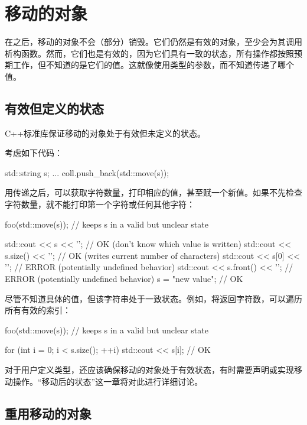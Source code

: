\section{移动的对象}
在之后，移动的对象不会（部分）销毁。它们仍然是有效的对象，至少会为其调用析构函数。然而，它们也是有效的，因为它们具有一致的状态，所有操作都按照预期工作，但不知道的是它们的值。这就像使用类型的参数，而不知道传递了哪个值。

\subsection{有效但定义的状态}

C++标准库保证移动的对象处于有效但未定义的状态。

考虑如下代码：

\begin{cppcode}
std::string s;
...
coll.push_back(std::move(s));
\end{cppcode}

用传递之后，可以获取字符数量，打印相应的值，甚至赋一个新值。如果不先检查字符数量，就不能打印第一个字符或任何其他字符：

\begin{cppcode}
foo(std::move(s)); // keeps s in a valid but unclear state

std::cout << s << '\n'; // OK (don’t know which value is written)
std::cout << s.size() << '\n'; // OK (writes current number of characters)
std::cout << s[0] << '\n'; // ERROR (potentially undefined behavior)
std::cout << s.front() << '\n'; // ERROR (potentially undefined behavior)
s = "new value"; // OK
\end{cppcode}

尽管不知道具体的值，但该字符串处于一致状态。例如，将返回字符数，可以遍历所有有效的索引：

\begin{cppcode}
foo(std::move(s)); // keeps s in a valid but unclear state

for (int i = 0; i < s.size(); ++i) {
	std::cout << s[i]; // OK
}
\end{cppcode}

对于用户定义类型，还应该确保移动的对象处于有效状态，有时需要声明或实现移动操作。“移动后的状态”这一章将对此进行详细讨论。

\subsection{重用移动的对象}

